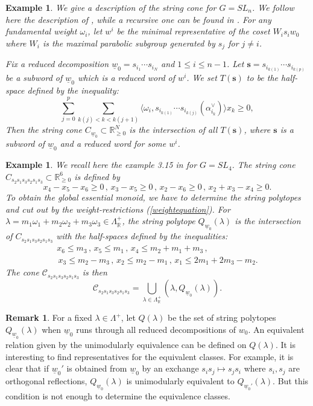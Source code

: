 \documentclass{emsprocart}
\newtheorem{exam}[theorem]{Example}
\newtheorem{example}[theorem]{Example}
\theoremstyle{definition}
\newtheorem{remark}[theorem]{Remark}
\begin{document}
\begin{exam}\label{Exo:String}\rm
We give a description of the string cone for $G=SL_n$. We follow here the description of \cite{BZ}, while a recursive one can be found in \cite{L3}. For any fundamental weight $\omega_i$, let
$w^i$ be the minimal representative of the coset $W_i s_i w_0$ where $W_i$ is the maximal parabolic subgroup generated by $s_j$ for $j \neq i$.
\par
Fix a reduced decomposition ${\underline{w}_0} = s_{i_1} \cdots s_{i_N}$ and $1 \leq i \leq n-1$. Let $\mathbf{s} = s_{i_{k(1)}} \cdots s_{i_{k(p)}}$ be a subword of ${\underline{w}_0} $ which is a reduced word of $w^i$. We set $T(\mathbf{s})$ to be the half-space defined by the inequality:
\[
\sum_{j=0}^p \sum_{k(j) < k < k(j+1)} \langle \omega_i,s_{i_{k(1)}} \cdots s_{i_{k(j)}}(\alpha_{i_k}^\vee)\rangle x_k \geq 0,
\]
Then the string cone $C_{{\underline{w}_0}} \subset \mathbb{R}^N_{\geq 0}$ is the intersection of all $T(\mathbf{s})$, where $\mathbf{s}$ is a subword of ${\underline{w}_0}$ and a reduced word for some $w^i$.
\end{exam}
\begin{example}\rm
We recall here the example 3.15 in \cite{BZ} for $G = SL_4$. The string cone $C_{s_2s_1s_3s_2s_1s_3} \subset \mathbb{R}^6_{\geq 0} $ is defined by
\[
x_4 - x_5 - x_6 \geq 0 \, , \, x_3 - x_5 \geq 0 \, ,\,x_2 - x_6 \geq 0 \, ,\, x_2 + x_3 - x_4 \geq 0.
\]
To obtain the global essential monoid, we have to determine the string polytopes and cut out by the weight-restrictions (\ref{weightequation}). 
For $\lambda = m_1\omega_1 + m_2 \omega_2 + m_3 \omega_3 \in \Lambda_{\mathbb{R}}^+$, the string polytope $Q_{{\underline{w}_0}}(\lambda)$ 
is the intersection of  $C_{s_2s_1s_3s_2s_1s_3} $ with the half-spaces defined by the inequalities:
$$
\begin{array}{c}
x_6 \leq m_3 \, , \, x_5 \leq m_1  \, , \, x_4 \leq m_2 + m_1 + m_3  \, , \\ \,  x_3 \leq m_2 - m_3  \, , \,  x_2 \leq m_2 - m_1  \, , \,  x_1 \leq 2m_1 + 2m_3 - m_2.
\end{array}
$$
The cone $\mathcal{C}_{s_2s_1s_3s_2s_1s_3}$ is then
\[
\mathcal{C}_{s_2s_1s_3s_2s_1s_3} = \bigcup_{\lambda \in \Lambda_{\mathbb{R}}^+} (\lambda, Q_{{\underline{w}_0}}(\lambda) ).
\]
\end{example}

\begin{remark}
For a fixed $\lambda\in\Lambda^+$, let $Q(\lambda)$ be the set of string polytopes $Q_{\underline{w}_0}(\lambda)$ when $\underline{w}_0$ runs through all reduced decompositions of $w_0$. An equivalent relation given by the unimodularly equivalence can be defined on $Q(\lambda)$. It is interesting to find representatives for the equivalent classes. For example, it is clear that if $\underline{w}_0'$ is obtained from ${\underline{w}_0}$ by an exchange $s_i s_j \mapsto s_j s_i$ where $s_i, s_j$ are orthogonal reflections, $Q_{{\underline{w}_0}}(\lambda)$ is unimodularly equivalent to $Q_{{\underline{w}_0'}}(\lambda)$. But this condition is not enough to determine the equivalence classes.
\end{remark}
\end{document}
